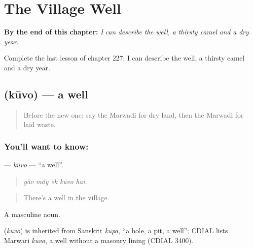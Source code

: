 
\chapter{The Village Well}
\label{ch:mw-the-village-well}

\begin{chapteropening}
\textbf{By the end of this chapter:} \emph{I can describe the well, a thirsty camel and a dry year.}

Complete the last lesson of chapter 227: I can describe the well, a thirsty camel and a dry year.
\end{chapteropening}

\section[\texorpdfstring{\mw{कूवो} (kūvo)}{कूवो (kūvo)}]{ (kūvo) — a well}

\label{lesson:MW-C227-kuvo}



\begin{quote}
Before the new one: say the Marwadi for dry land, then the Marwadi for laid waste.
\end{quote}

\subsection*{You'll want to know: }
\textbf{} — \emph{kūvo} — \textquotedblleft{}a well\textquotedblright{}.

\begin{quote}
    
\end{quote}

\begin{quote}
\emph{gā̃v mā̃y ek kūvo hai.}
\end{quote}

\begin{quote}
There's a well in the village.
\end{quote}

A masculine noun.

\begin{cousinweb}
\textbf{} (\emph{kūvo}) is inherited from Sanskrit \emph{kūpa}, \textquotedblleft{}a hole, a pit, a well\textquotedblright{}; CDIAL lists Marwari \emph{kūvo}, a well without a masonry lining (CDIAL 3400).
\end{cousinweb}

